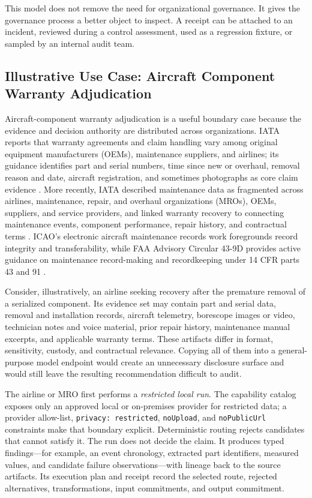 \documentclass[conference]{IEEEtran}
\newcommand{\code}[1]{\texttt{\small #1}}
\begin{document}
This model does not remove the need for organizational governance. It gives the
governance process a better object to inspect. A receipt can be attached to an
incident, reviewed during a control assessment, used as a regression fixture, or
sampled by an internal audit team.

\subsection{Illustrative Use Case: Aircraft Component Warranty Adjudication}

Aircraft-component warranty adjudication is a useful boundary case because the
evidence and decision authority are distributed across organizations. IATA
reports that warranty agreements and claim handling vary among original
equipment manufacturers (OEMs), maintenance suppliers, and airlines; its
guidance identifies part and serial numbers, time since new or overhaul, removal
reason and date, aircraft registration, and sometimes photographs as core claim
evidence \cite{iataWarranty2024}. More recently, IATA described maintenance data
as fragmented across airlines, maintenance, repair, and overhaul organizations
(MROs), OEMs, suppliers, and service providers, and linked warranty recovery to
connecting maintenance events, component performance, repair history, and
contractual terms \cite{iataWmes2026}. ICAO's electronic aircraft maintenance
records work foregrounds record integrity and transferability, while FAA
Advisory Circular 43-9D provides active guidance on maintenance record-making
and recordkeeping under 14 CFR parts 43 and 91 \cite{icaoEamr,faaAc439d}.

Consider, illustratively, an airline seeking recovery after the premature
removal of a serialized component. Its evidence set may contain part and serial
data, removal and installation records, aircraft telemetry, borescope images or
video, technician notes and voice material, prior repair history, maintenance
manual excerpts, and applicable warranty terms. These artifacts differ in
format, sensitivity, custody, and contractual relevance. Copying all of them
into a general-purpose model endpoint would create an unnecessary disclosure
surface and would still leave the resulting recommendation difficult to audit.

The airline or MRO first performs a \emph{restricted local run}. The capability
catalog exposes only an approved local or on-premises provider for restricted
data; a provider allow-list, \code{privacy: restricted}, \code{noUpload}, and
\code{noPublicUrl} constraints make that boundary explicit. Deterministic
routing rejects candidates that cannot satisfy it. The run does not decide the
claim. It produces typed findings---for example, an event chronology, extracted
part identifiers, measured values, and candidate failure observations---with
lineage back to the source artifacts. Its execution plan and receipt record the
selected route, rejected alternatives, transformations, input commitments, and
output commitment.
\end{document}
